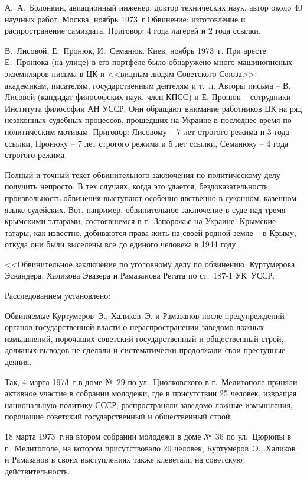 \documentclass{book}
\begin{document}
А.~А.~Болонкин, авиационный инженер, доктор технических наук, автор около 40 научных работ. Москва, ноябрь 1973~г.Обвинение: изготовление и распространение самиздата. Приговор: 4 года лагерей и 2 года ссылки.

В.~Лисовой, Е.~Пронюк, И.~Семанюк. Киев, ноябрь 1973~г. При аресте Е.~Пронюка (на улице) в его портфеле было обнаружено много машинописных экземпляров письма в ЦК и <<видным людям Советского Союза>>: академикам, писателям, государственным деятелям и т.~п. Авторы письма -- В. Лисовой (кандидат философских наук, член КПСС) и Е. Пронюк -- сотрудники Института философии АН УССР. Они обращают внимание работников ЦК на ряд незаконных судебных про­цессов, прошедших на Украине в последнее время по политическим мотивам. Приговор: Лисовому -- 7 лет строгого режи­ма и 3 года ссылки, Пронюку -- 7 лет строгого режима и 5 лет ссылки, Семанюку -- 4 года строгого режима.

Полный и точный текст обвинительного заключения по политическому делу получить непросто. В тех случаях, когда это удается, бездоказательность, произвольность обвинения выступают особенно явственно в суконном, казенном языке судейских. Вот, например, обвинительное заключение в суде над тремя крымскими татарами, состоявшемся в г.~Запорожье на Украине. Крымские татары, как известно, добиваются права жить на своей родной земле -- в Крыму, откуда они были выселены все до единого человека в 1944 году.

<<Обвинительное заключение по уголовному делу по обвинению: Куртумерова Эскандера, Халикова Эвазера и Рамазанова Регата по ст.~187-1 УК~УССР.

Расследованием установлено:

Обвиняемые Куртумеров~Э., Халиков~Э. и Рамазанов после предупреждений органов государственной власти о нераспространении заведомо ложных измышлений, порочащих советский государственный и общественный строй, должных выводов не сделали и систематически продолжали свои преступные деяния.

Так, 4 марта 1973~г.в доме №~29 по ул.~Циолковского в г.~Мелитополе приняли активное участие в собрании молодежи, где в присутствии 25 человек, извращая национальную политику СССР, распространяли заведомо ложные измышления, порочащие советский государственный и общественный строй.

18 марта 1973~г.на втором собрании молодежи в доме №~36 по ул.~Цюрюпы в г.~Мелитополе, на котором присутствовало 20 человек, Куртумеров~Э., Халиков и Рамазанов в своих выступлениях также клеветали на советскую действительность.
\end{document}
